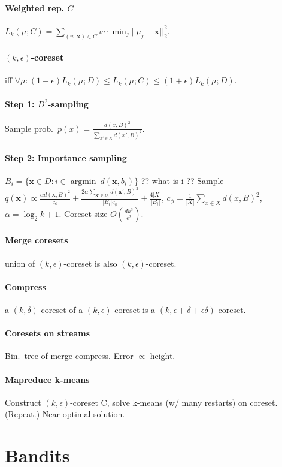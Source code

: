 \documentclass[9pt]{scrartcl}
\DeclareMathOperator{\argmin}{argmin}
\newcommand{\eps}{\epsilon}
\begin{document}
\begin{twocolumn}
\paragraph{Weighted rep. $C$} $L_k(\mu;C) = \sum_{(w,\bm x)\in C}w\cdot\min_j||\mu_j - \bm x||_2^2$.

\paragraph{$(k,\eps)$-coreset} iff $\forall\mu: (1-\eps)L_k(\mu;D) \leq L_k(\mu;C) \leq (1+\eps)L_k(\mu;D)$.

\paragraph{Step 1: $D^2$-sampling}
Sample prob.\ $p(x) = \frac{d(x,B)^2}{\sum_{x' \in X} d(x', B)^2}$.

\paragraph{Step 2: Importance sampling}
$B_i = \{\bm x\in D: i \in \argmin\ d(\bm x,b_i)\}$ ?? what is i ??
Sample $q(\bm x) \propto \frac{\alpha d(\bm x,B)^2}{c_\phi} + \frac{2\alpha\sum_{\bm x'\in B_i} d(\bm x',B)^2}{|B_i|c_\phi} + \frac{4|X|}{|B_i|}$, $c_\phi = \frac{1}{|X|}\sum_{x\in X}d(x,B)^2$, $\alpha = \log_2 k + 1$.
Coreset size $O(\frac{dk^3}{\eps^2})$.

\paragraph{Merge coresets} union of $(k,\eps)$-coreset is also $(k,\eps)$-coreset.

\paragraph{Compress} a $(k,\delta)$-coreset of a $(k,\eps)$-coreset is a $(k,\eps+\delta+\eps\delta)$-coreset.

\paragraph{Coresets on streams} Bin.\ tree of merge-compress. Error $\propto$ height.

\paragraph{Mapreduce k-means} Construct $(k,\eps)$-coreset C, solve k-means (w/ many restarts) on coreset. (Repeat.) Near-optimal solution.

\section{Bandits}

\end{twocolumn}

\appendix
\end{document}
